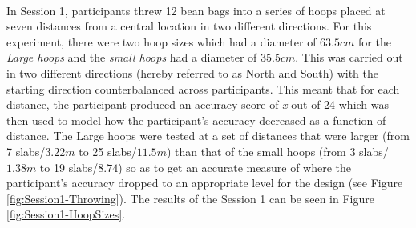 \documentclass[12pt]{article}
\begin{document}
\paragraph{} In Session 1, participants threw 12 bean bags into a series of hoops placed at seven distances from a central location in two different directions. For this experiment, there were two hoop sizes which had a diameter of $63.5cm$ for the \textit{Large hoops} and the \textit{small hoops} had a diameter of $35.5cm$. This was carried out in two different directions (hereby referred to as North and South) with the starting direction counterbalanced across participants. This meant that for each distance, the participant produced an accuracy score of \textit{x} out of 24 which was then used to model how the participant's accuracy decreased as a function of distance. The Large hoops were tested at a set of distances that were larger (from 7 slabs/$3.22m$ to 25 slabs/$11.5m$) than that of the small hoops (from 3 slabs/$1.38m$ to 19 slabs/$8.74$) so as to get an accurate measure of where the participant's accuracy dropped to an appropriate level for the design (see Figure \ref{fig:Session1-Throwing}). The results of the Session 1 can be seen in Figure \ref{fig:Session1-HoopSizes}.
\end{document}
